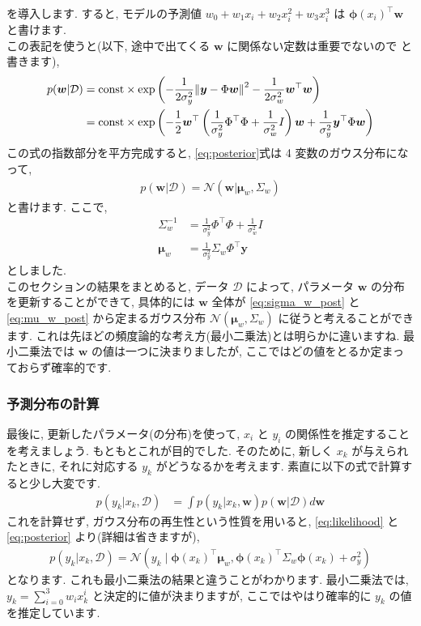 \documentclass[b5paper,10pt]{jsarticle}
\begin{document}
を導入します. すると, モデルの予測値 $w_0 + w_1 x_i + w_2 x_i^2 + w_3 x_i^3$ は $\bm{\phi}(x_i)^\top \bm{w}$ と書けます. \\
この表記を使うと(以下, 途中で出てくる $\bm{w}$ に関係ない定数は重要でないので  と書きます), 
\begin{align}
    p(\bm{w} | \mathcal{D})
    &= \text{const} \times \exp\left(
        -\frac{1}{2\sigma_y^2}\norm{\bm{y} - \Phi \bm{w}}^2
        -\frac{1}{2\sigma_w^2}\bm{w}^\top \bm{w}
    \right) \\
    &= \text{const} \times \exp\left(
        -\frac{1}{2}\bm{w}^\top \left(
            \frac{1}{\sigma_y^2}\Phi^\top \Phi + \frac{1}{\sigma_w^2}I
        \right)\bm{w}
        + \frac{1}{\sigma_y^2}\bm{y}^\top \Phi \bm{w}
    \right) \label{eq:posterior}
\end{align}
この式の指数部分を平方完成すると, \eqref{eq:posterior}式は 4 変数のガウス分布になって, 
\begin{align}
    p(\bm{w} | \mathcal{D}) = \mathcal{N}(\bm{w} | \bm{\mu}_w, \Sigma_w)
\end{align}
と書けます. 
ここで, 
\begin{align}
    \Sigma_w^{-1} &= \frac{1}{\sigma_y^2}\Phi^\top \Phi + \frac{1}{\sigma_w^2}I \label{eq:sigma_w_post} \\
    \bm{\mu}_w &= \frac{1}{\sigma_y^2}\Sigma_w \Phi^\top \bm{y} \label{eq:mu_w_post}
\end{align}
としました. \\
このセクションの結果をまとめると, データ $\mathcal{D}$ によって, パラメータ $\bm{w}$ の分布を更新することができて, 
具体的には $\bm{w}$ 全体が \eqref{eq:sigma_w_post} と \eqref{eq:mu_w_post} から定まるガウス分布 $\mathcal{N}(\bm{\mu}_w, \Sigma_w)$ に従うと考えることができます. 
これは先ほどの頻度論的な考え方(最小二乗法)とは明らかに違いますね. 最小二乗法では $\bm{w}$ の値は一つに決まりましたが, ここではどの値をとるか定まっておらず確率的です. 
\subsubsection{予測分布の計算}
最後に, 更新したパラメータ(の分布)を使って, $x_i$ と $y_i$ の関係性を推定することを考えましょう. もともとこれが目的でした. そのために, 新しく $x_k$ が与えられたときに, 
それに対応する $y_k$ がどうなるかを考えます. 素直に以下の式で計算すると少し大変です. 
\begin{align}
    p(y_k | x_k, \mathcal{D}) &= \int p(y_k | x_k, \bm{w}) p(\bm{w} | \mathcal{D}) d\bm{w} 
\end{align}
これを計算せず, ガウス分布の再生性という性質を用いると,  \eqref{eq:likelihood} と \eqref{eq:posterior} より(詳細は省きますが), 
\begin{align}
    p(y_k | x_k, \mathcal{D}) = \mathcal{N}\left(y_k \mid \bm{\phi}(x_k)^\top \bm{\mu}_w, \bm{\phi}(x_k)^\top \Sigma_w \bm{\phi}(x_k) + \sigma_y^2\right) \label{eq:predictive}
\end{align}
となります. これも最小二乗法の結果と違うことがわかります. 最小二乗法では, $y_k = \sum_{i=0}^3 w_i x_k^i$ と決定的に値が決まりますが, ここではやはり確率的に $y_k$ の値を推定しています. 
\end{document}
